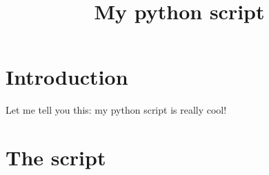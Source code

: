 \documentclass[12pt]{article}
\title{My python script}
\date{}
\begin{document}
  \maketitle

\section{Introduction}
Let me tell you this: my python script is really cool!

\section{The script}

\end{document}
